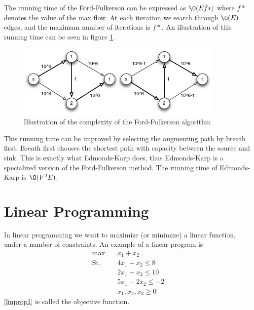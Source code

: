 \documentclass[10pt]{article}
\begin{document}
The running time of the Ford-Fulkerson can be expressed as $\O(E\dot f*)$ where $f*$ denotes the value of the max flow. At each iteration we search through $\O(E)$ edges, and the maximum number of iterations is $f*$. An illustration of this running time can be seen in figure \ref{fig2}.

\begin{figure}[ht]
\centering
\includegraphics[width=0.9\textwidth]{figures/fig2.pdf}
\caption{Illustration of the complexity of the Ford-Fulkerson algorithm}
\label{fig2}
\end{figure}

This running time can be improved by selecting the augmenting path by breath first. Breath first chooses the shortest path with capacity between the source and sink. This is exactly what Edmonds-Karp does, thus Edmonds-Karp is a specialized version of the Ford-Fulkerson method. The running time of Edmonds-Karp is $\O(V^2E)$.



\clearpage \newpage
\section{Linear Programming} %
\label{sec:linear_programming}

In linear programming we want to maximize (or minimize) a linear function, under a number of constraints. An example of a linear program is
\begin{align}
 \max &\quad x_1 + x_2 \label{linprop1}\\ 
 \text{St.} &\quad  4x_1 - x_2  \leq 8 \nonumber\\
            &\quad  2x_1 + x_2  \leq 10 \nonumber\\
            &\quad  5x_1 - 2x_2 \leq -2 \nonumber\\            
            &\quad  x_1,x_2,x_3 \geq 0  \nonumber
\end{align}
\ref{linprop1} is called the objective function.
                                                                      
\end{document}
